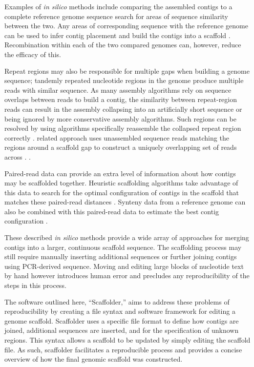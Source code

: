 \documentclass[10pt]{bmc_article}
\newenvironment{bmcformat}{\begin{raggedright}\baselineskip20pt\sloppy\setboolean{publ}{false}}{\end{raggedright}\baselineskip20pt\sloppy}
\begin{document}
\begin{bmcformat}
Examples of \emph{in silico} methods include 
comparing the assembled contigs to a complete reference genome sequence
 search for areas of sequence similarity between the
two. Any areas of corresponding sequence with the reference genome can be used
to infer contig placement and build the contigs into a scaffold
\cite{richter2007,zhao2008,assefa2009}. Recombination within each of the two
compared genomes can, however, reduce the efficacy of this. \pb

Repeat regions may also be responsible for multiple gaps when building
a genome sequence; tandemly repeated nucleotide regions in the genome produce
multiple reads with similar sequence. As many assembly algorithms rely on
sequence overlaps between reads to build a contig, the similarity between
repeat-region reads can result in the assembly collapsing into an artificially
short sequence or being ignored by more conservative assembly algorithms. Such
regions can be resolved by using algorithms  specifically reassemble
the collapsed repeat region correctly \cite{mulyukov2002,koren2010}.
 related approach uses unassembled sequence reads matching
the regions around a scaffold gap to construct a uniquely overlapping set of
reads across . \cite{tsai2010}. \pb

Paired-read data can provide an extra level of information about how contigs
may be scaffolded together. Heuristic scaffolding algorithms take advantage of
this data to search for the optimal configuration of contigs in the scaffold
that matches these paired-read distances \cite{dayarian2010,boetzer2011}.
Synteny data from a reference genome can also be combined with this
paired-read data to estimate the best contig configuration \cite{pop2004}. \pb

These described \emph{in silico} methods provide a wide array of approaches for
merging contigs into a larger, continuous scaffold sequence.
 The scaffolding process may still require manually
inserting additional sequences or further joining contigs using PCR-derived
sequence. Moving and editing large blocks of nucleotide text by hand however
 introduces human error and precludes any reproducibility of
the steps in this process. \pb

The software outlined here, ``Scaffolder,'' aims to address these problems of
reproducibility by creating a file syntax and software framework for editing
a genome scaffold. Scaffolder uses a specific file format to define how
contigs are joined, additional sequences are inserted, and for the
specification of unknown regions. This syntax allows a scaffold to be updated
by simply editing the scaffold file. As such, scaffolder facilitates
a reproducible  process and provides a concise
overview of how the final genomic scaffold was constructed. \pb


\end{bmcformat}
\end{document}
